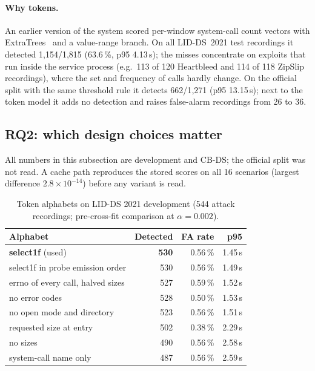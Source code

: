 \paragraph{Why tokens.} An earlier version of the system scored per-window system-call count vectors with
ExtraTrees~\cite{geurts2006} and a value-range branch. On all LID-DS~2021 test recordings it detected 1{,}154/1{,}815
(63.6\,\%, p95 4.13\,s); the misses concentrate on exploits that run inside the service process (e.g.\ 113 of 120
Heartbleed and 114 of 118 ZipSlip recordings), where the set and frequency of calls hardly change. On the official split
with the same threshold rule it detects 662/1{,}271 (p95 13.15\,s); next to the token model it adds no detection and
raises false-alarm recordings from 26 to 36.

\subsection{RQ2: which design choices matter}\label{sec:eval-design}

All numbers in this subsection are development and CB-DS; the official split was not read. A cache path reproduces the
stored scores on all 16 scenarios (largest difference $2.8\times10^{-14}$) before any variant is read.

\begin{table}[t]
\centering\small
\caption{Token alphabets on LID-DS 2021 development (544 attack recordings; pre-cross-fit comparison at $\alpha=0.002$).}
\label{tab:alphabets}
\begin{tabular}{@{}lrrr@{}}
\toprule
Alphabet & Detected & FA rate & p95 \\
\midrule
\textbf{select1f} (used) & \textbf{530} & 0.56\,\% & 1.45\,s \\
select1f in probe emission order & 530 & 0.56\,\% & 1.49\,s \\
errno of every call, halved sizes & 527 & 0.59\,\% & 1.52\,s \\
no error codes & 528 & 0.50\,\% & 1.53\,s \\
no open mode and directory & 523 & 0.56\,\% & 1.51\,s \\
requested size at entry & 502 & 0.38\,\% & 2.29\,s \\
no sizes & 490 & 0.56\,\% & 2.58\,s \\
system-call name only & 487 & 0.56\,\% & 2.59\,s \\
\bottomrule
\end{tabular}
\end{table}

